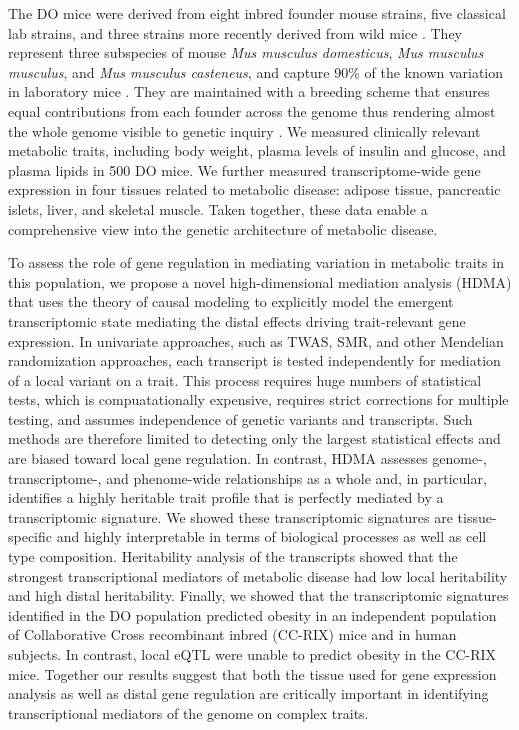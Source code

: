 \documentclass[
]{article}
\begin{document}
The DO mice were derived from eight inbred founder mouse strains, five
classical lab strains, and three strains more recently derived from wild
mice \cite{pmid22892839}. They represent three subspecies of mouse
\textit{Mus musculus domesticus}, \textit{Mus musculus musculus}, and
\textit{Mus musculus casteneus}, and capture 90\% of the known variation
in laboratory mice \cite{pmid31133439}. They are maintained with a
breeding scheme that ensures equal contributions from each founder
across the genome thus rendering almost the whole genome visible to
genetic inquiry \cite{pmid22892839}. We measured clinically relevant
metabolic traits, including body weight, plasma levels of insulin and
glucose, and plasma lipids in 500 DO mice. We further measured
transcriptome-wide gene expression in four tissues related to metabolic
disease: adipose tissue, pancreatic islets, liver, and skeletal muscle.
Taken together, these data enable a comprehensive view into the genetic
architecture of metabolic disease.

To assess the role of gene regulation in mediating variation in
metabolic traits in this population, we propose a novel high-dimensional
mediation analysis (HDMA) that uses the theory of causal modeling to
explicitly model the emergent transcriptomic state mediating the distal
effects driving trait-relevant gene expression. In univariate
approaches, such as TWAS, SMR, and other Mendelian randomization
approaches, each transcript is tested independently for mediation of a
local variant on a trait. This process requires huge numbers of
statistical tests, which is compuatationally expensive, requires strict
corrections for multiple testing, and assumes independence of genetic
variants and transcripts. Such methods are therefore limited to
detecting only the largest statistical effects and are biased toward
local gene regulation. In contrast, HDMA assesses genome-,
transcriptome-, and phenome-wide relationships as a whole and, in
particular, identifies a highly heritable trait profile that is
perfectly mediated by a transcriptomic signature. We showed these
transcriptomic signatures are tissue-specific and highly interpretable
in terms of biological processes as well as cell type composition.
Heritability analysis of the transcripts showed that the strongest
transcriptional mediators of metabolic disease had low local
heritability and high distal heritability. Finally, we showed that the
transcriptomic signatures identified in the DO population predicted
obesity in an independent population of Collaborative Cross recombinant
inbred (CC-RIX) mice and in human subjects. In contrast, local eQTL were
unable to predict obesity in the CC-RIX mice. Together our results
suggest that both the tissue used for gene expression analysis as well
as distal gene regulation are critically important in identifying
transcriptional mediators of the genome on complex traits.
\end{document}
